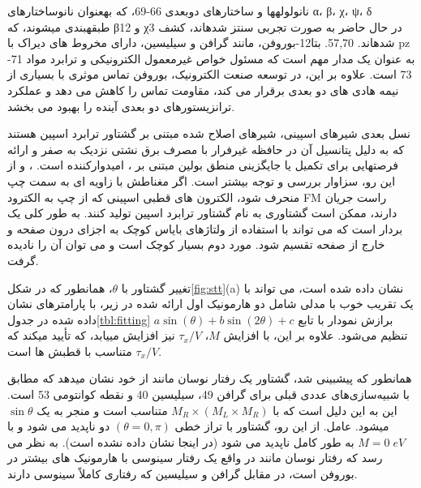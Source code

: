 نانولولهها و ساختارهای دوبعدی 66-69، که بهعنوان نانوساختارهای α، β، χ، ψ، δ طبقهبندی میشوند، که β12 و χ3 در حال حاضر به صورت تجربی سنتز شدهاند، کشف شدهاند. 57,70. بتا12-بوروفن، مانند گرافن و سیلیسین، دارای مخروط های دیراک با pz به عنوان یک مدار مهم است که مسئول خواص غیرمعمول الکترونیکی و ترابرد مواد 71-73 است. علاوه بر این، در توسعه صنعت الکترونیک، بوروفن تماس موثری با بسیاری از نیمه هادی های دو بعدی برقرار می کند، مقاومت تماس را کاهش می دهد و عملکرد ترانزیستورهای دو بعدی آینده را بهبود می بخشد.

نسل بعدی شیرهای اسپینی، شیرهای اصلاح شده مبتنی بر گشتاور ترابرد اسپین  هستند که به دلیل پتانسیل آن در حافظه غیرفرار با مصرف برق نشتی نزدیک به صفر و ارائه فرصتهایی برای تکمیل یا جایگزینی منطق بولین مبتنی بر ، امیدوارکننده است. ، و از این رو، سزاوار بررسی و توجه بیشتر است. اگر مغناطش با زاویه ای به سمت چپ منحرف شود، الکترون های قطبی اسپینی که از چپ به الکترود FM راست جریان دارند، ممکن است گشتاوری به نام گشتاور ترابرد اسپین  تولید کنند. به طور کلی  یک بردار است که می تواند با استفاده از ولتاژهای بایاس کوچک به اجزای درون صفحه و خارج از صفحه تقسیم شود. مورد دوم بسیار کوچک است و می توان آن را نادیده گرفت. 

تغییر گشتاور با $\theta$، همانطور که در شکل\ref{fig:stt}(a) نشان داده شده است، می تواند با یک تقریب خوب با مدلی شامل دو هارمونیک اول ارائه شده در زیر، با پارامترهای نشان داده شده در جدول\ref{tbl:fitting} برازش نمودار  با تابع $a\sin(\theta)+b\sin(2\theta)+c$ تنظیم می‌شود. علاوه بر این، با افزایش $M$، $\tau_{x}/V$ نیز افزایش مییابد، که تأیید میکند که $\tau_{x}/V$ متناسب با قطبش  ها است.

همانطور که پیشبینی شد، گشتاور یک رفتار نوسان مانند از خود نشان میدهد که مطابق با شبیه‌سازی‌های عددی قبلی برای گرافن 49، سیلیسین 40 و نقطه کوانتومی 53 است. این به این دلیل است که  با $M_R \times (M_L \times M_R)$ متناسب است و منجر به یک $\sin\theta$ میشود. عامل. از این رو، گشتاور با تراز خطی $(\theta = 0, \pi)$ دو  ناپدید می شود و با $M = 0\; eV$ به طور کامل ناپدید می شود (در اینجا نشان داده نشده است). به نظر می رسد که رفتار نوسان مانند در واقع یک رفتار سینوسی با هارمونیک های بیشتر در بوروفن است، در مقابل گرافن و سیلیسین که رفتاری کاملاً سینوسی دارند. 

